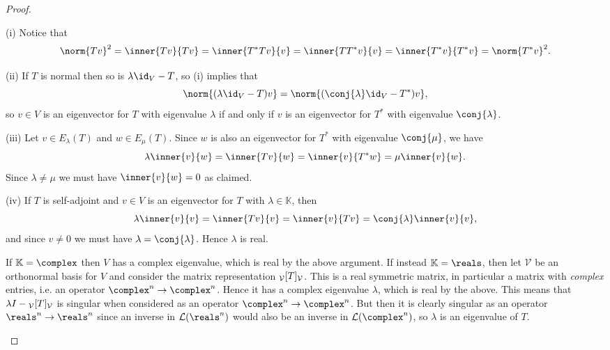\documentclass[article, a4paper, 11pt, oneside]{memoir}
\numberwithin{equation}{chapter}
\newcommand{\calL}{\mathcal{L}}
\newcommand{\calV}{\mathcal{V}}
\begin{document}
\begin{proof}
\begin{proofsec}
    \item[(i)]
    Notice that
    \begin{equation*}
        \norm{Tv}^2
            = \inner{Tv}{Tv}
            = \inner{T^*Tv}{v}
            = \inner{TT^*v}{v}
            = \inner{T^*v}{T^*v}
            = \norm{T^*v}^2.
    \end{equation*}

    \item[(ii)]
    If $T$ is normal then so is $\lambda \id_V - T$, so (i) implies that
    \begin{equation*}
        \norm{(\lambda \id_V - T)v}
            = \norm{(\conj{\lambda} \id_V - T^*)v},
    \end{equation*}
    so $v \in V$ is an eigenvector for $T$ with eigenvalue $\lambda$ if and only if $v$ is an eigenvector for $T^*$ with eigenvalue $\conj{\lambda}$.

    \item[(iii)]
    Let $v \in E_\lambda(T)$ and $w \in E_\mu(T)$. Since $w$ is also an eigenvector for $T^*$ with eigenvalue $\conj{\mu}$, we have
    \begin{equation*}
        \lambda \inner{v}{w}
            = \inner{Tv}{w}
            = \inner{v}{T^*w}
            = \mu \inner{v}{w}.
    \end{equation*}
    Since $\lambda \neq \mu$ we must have $\inner{v}{w} = 0$ as claimed.

    \item[(iv)]
    If $T$ is self-adjoint and $v \in V$ is an eigenvector for $T$ with $\lambda \in \mathbb{K}$, then
    \begin{equation*}
        \lambda \inner{v}{v}
            = \inner{Tv}{v}
            = \inner{v}{Tv}
            = \conj{\lambda} \inner{v}{v},
    \end{equation*}
    and since $v \neq 0$ we must have $\lambda = \conj{\lambda}$. Hence $\lambda$ is real.

    If $\mathbb{K} = \complex$ then $V$ has a complex eigenvalue, which is real by the above argument. If instead $\mathbb{K} = \reals$, then let $\calV$ be an orthonormal basis for $V$ and consider the matrix representation $\mr{\calV}{T}{\calV}$. This is a real symmetric matrix, in particular a matrix with \emph{complex} entries, i.e. an operator $\complex^n \to \complex^n$. Hence it has a complex eigenvalue $\lambda$, which is real by the above. This means that $\lambda I - \mr{\calV}{T}{\calV}$ is singular when considered as an operator $\complex^n \to \complex^n$. But then it is clearly singular as an operator $\reals^n \to \reals^n$ since an inverse in $\calL(\reals^n)$ would also be an inverse in $\calL(\complex^n)$, so $\lambda$ is an eigenvalue of $T$.
\end{proofsec}
\end{proof}
\end{document}
